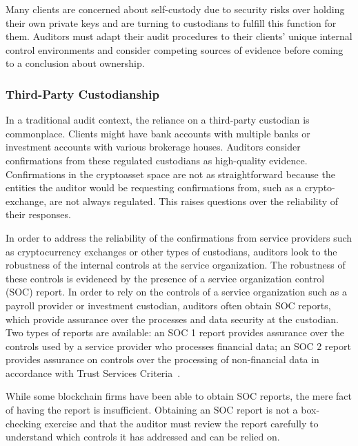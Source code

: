 Many clients are concerned about self-custody due to security risks over holding their own private keys and are turning to custodians to fulfill this function for them. Auditors must adapt their audit procedures to their clients' unique internal control environments and consider competing sources of evidence before coming to a conclusion about ownership. 


\subsubsection{Third-Party Custodianship}\label{sec:auditing:framework:ownership:custodianship}

In a traditional audit context, the reliance on a third-party custodian is commonplace. Clients might have bank accounts with multiple banks or investment accounts with various brokerage houses. Auditors consider confirmations from these regulated custodians as high-quality evidence. Confirmations in the cryptoasset space are not as straightforward because the entities the auditor would be requesting confirmations from, such as a crypto-exchange, are not always regulated. This raises questions over the reliability of their responses. 

In order to address the reliability of the confirmations from service providers such as cryptocurrency exchanges or other types of custodians, auditors look to the robustness of the internal controls at the service organization. The robustness of these controls is evidenced by the presence of a service organization control (SOC) report. In order to rely on the controls of a service organization such as a payroll provider or investment custodian, auditors often obtain SOC reports, which provide assurance over the processes and data security at the custodian. Two types of reports are available: an SOC 1 report provides assurance over the controls used by a service provider who processes financial data; an SOC 2 report provides assurance on controls over the processing of non-financial data in accordance with Trust Services Criteria~\cite{bdosocreports}. 

While some blockchain firms have been able to obtain SOC reports, the mere fact of having the report is insufficient. Obtaining an SOC report is not a box-checking exercise and that the auditor must review the report carefully to understand which controls it has addressed and can be relied on.


